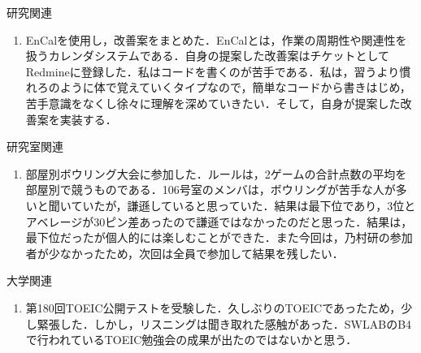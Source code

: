 \documentclass[fleqn, 14pt]{extarticlej}
\renewcommand\labelenumi{(\theenumi)}
\begin{document}
\begin{description}
  \itemsep -1mm

\item[　2.1] 研究関連
  \vspace{-0.8em}
  \begin{enumerate}
    \renewcommand{\labelenumi}{(1)}
  \item EnCalを使用し，改善案をまとめた．EnCalとは，作業の周期性や関連性を扱うカレンダシステムである．自身の提案した改善案はチケットとしてRedmineに登録した．私はコードを書くのが苦手である．私は，習うより慣れろのように体で覚えていくタイプなので，簡単なコードから書きはじめ，苦手意識をなくし徐々に理解を深めていきたい．そして，自身が提案した改善案を実装する．\\
    
  \end{enumerate}

  \vspace{-0.5em}
  \item[　2.2] 研究室関連
    \vspace{-1.0em}
    \begin{enumerate}
      \renewcommand{\labelenumi}{(2)}
    \item 部屋別ボウリング大会に参加した．ルールは，2ゲームの合計点数の平均を部屋別で競うものである．106号室のメンバは，ボウリングが苦手な人が多いと聞いていたが，謙遜していると思っていた．結果は最下位であり，3位とアベレージが30ピン差あったので謙遜ではなかったのだと思った．結果は，最下位だったが個人的には楽しむことができた．また今回は，乃村研の参加者が少なかったため，次回は全員で参加して結果を残したい．
    
    \end{enumerate}

\vspace{-0.5em}
\item[　2.3] 大学関連
\vspace{-0.8em}
	\begin{enumerate}
	  \renewcommand{\labelenumi}{(2)}
	\item 第180回TOEIC公開テストを受験した．久しぶりのTOEICであったため，少し緊張した．しかし，リスニングは聞き取れた感触があった．SWLABのB4で行われているTOEIC勉強会の成果が出たのではないかと思う．
	\end{enumerate}

\end{description}

\vspace{-1.5em}
\end{document}

